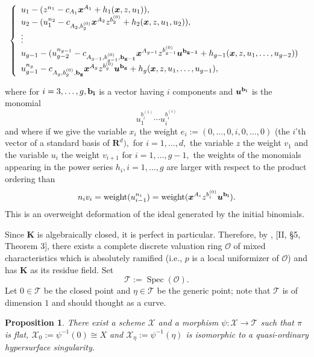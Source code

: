 \documentclass[11pt, a4paper]{amsart}
\numberwithin{equation}{section}
\theoremstyle{plain}
\newtheorem{Prop}[Thm]{Proposition}
\theoremstyle{definition}
\theoremstyle{remark}
\newcommand{\K}{\mathbf{K}}
\newcommand{\cO}{\mathcal{O}}
\newcommand{\cT}{\mathcal{T}}
\newcommand{\cX}{\mathcal{X}}
\newcommand{\0}{{\boldsymbol 0}}
\renewcommand{\u}{{\boldsymbol u}}
\newcommand{\x}{{\boldsymbol x}}
\newcommand{\Spec}{\operatorname{Spec}}
\begin{document}
\begin{equation}
	\label{equations}
\left\{ 
\begin{array}{l}
	u_1-(z^{n_1}-c_{A_1}\x^{A_1}+h_1(\x,z,u_1)),  \\
	u_2-(u_1^{n_2} -c_{A_2,b_2^{(0)}}\x^{A_2}z^{b_2^{(0)}}+h_2(\x,z,u_1,u_2)),\\
	\vdots \\
	u_{g-1}-(u_{g-2}^{n_{g-1}}-c_{A_{g-1},b_{g-1}^{(0)},\bf{b_{g-1}}}\x^{A_{g-1}}z^{b_{g-1}^{(0)}}\u^{\bf{b_{g-1}}}+h_{g-1}(\x,z,u_1,\ldots,u_{g-2}))
	\\
	u_{g-1}^{n_g}-c_{A_{g},b_{g}^{(0)},\bf{b_{g}}}\x^{A_{g}}z^{b_{g}^{(0)}}\u^{\bf{b_{g}}}+h_{g}(\x,z,u_1,\ldots,u_{g-1}), 
\end{array} 
\right.
\end{equation}    


where for $i=3,\ldots,g ,\bf{b_{i}}$ is a vector having $i$ components and $\u^{\bf{b_{i}}}$ is the monomial 
$$u_1^{b_{i}^{(1)}}\cdots u_{i}^{b_{i}^{(i)}}$$ and where if we give the variable $x_i$ the weight $e_i:=(0,\ldots,0,i,0,\ldots,0)$ (the    $i$'th vector of a standard basis of $\mathbf{R}^d),$ for $i=1,\ldots,d,$ the variable $z$ the weight $v_1$ and the variable $u_i$ the weight $v_{i+1}$ for $i=1,\ldots,g-1,$ the weights of the monomials appearing in the power series $h_i,i=1,\ldots,g$ are larger with respect to the product ordering than
 $$n_iv_{i}=\mathrm{weight}(u_{i-1}^{n_i})=\mathrm{weight}(
\x^{A_i} z^{b_{i}^{(0)}}\u^{\bf{b_{i}}}).$$
 This is an overweight deformation of the ideal generated by the initial binomials.

     

Since $ \K $ is algebraically closed, it is perfect in particular.
Therefore, by \cite{LocalFields}, [II, \S 5, Theorem 3],
there exists a complete discrete valuation ring $ \cO $ of mixed characteristics
which is absolutely ramified (i.e., $ p $ is a local uniformizer of $ \cO$)
and has $ \K $ as its residue field. 
Set 
\[
	\cT := \Spec (\cO).
\]
Let $ 0 \in \cT $ be the closed point and $ \eta \in \cT $ be the generic point; note that $\cT$ is of dimension $1$ and should thought as a curve.

\begin{Prop}
	\label{Prop:family_for_characteristic_change}
	There exist a scheme $ \cX $ and a morphism $ \psi \colon \cX \to \cT $ such that  
	$ \pi $ is flat,	
	$ \cX_0 := \psi^{-1} (0) \cong X $ and $ \cX_\eta := \psi^{-1} (\eta) $ is isomorphic to a quasi-ordinary hypersurface singularity. 
\end{Prop} 
\end{document}
